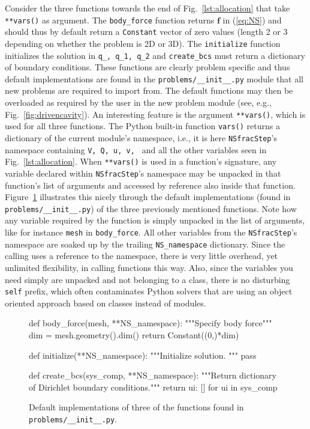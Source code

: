 \documentclass[final,3p,times,twocolumn]{elsarticle}
\newcommand{\inpyth}{\lstinline[style=inlinestyle]} %[]%
\begin{document}
Consider the three functions towards the end of Fig.~\ref{lst:allocation} that take \inpyth{**vars()} as argument. The \inpyth{body_force} function returns $\bm{f}$ in (\ref{eq:NS}) and should thus by default return a \inpyth{Constant} vector of zero values (length 2 or 3 depending on whether the problem is 2D or 3D). The \inpyth{initialize} function initializes the solution in \inpyth{q_, q_1, q_2} and \inpyth{create_bcs} must return a dictionary of boundary conditions. These functions are clearly problem specific and thus default implementations are found in the \inpyth{problems/__init__.py} module that all new problems are required to import from. The default functions may then be overloaded as required by the user in the new problem module (see, e.g., Fig.~\ref{fig:drivencavity}). An interesting feature is the argument \inpyth{**vars()}, which is used for all three functions. The Python built-in function \inpyth{vars()} returns a dictionary of the current module's namespace, i.e., it is here \inpyth{NSfracStep}'s namespace containing \inpyth{V, Q, u, v, } and all the other variables seen in Fig.~\ref{lst:allocation}. When \inpyth{**vars()} is used in a function's signature, any variable declared within \inpyth{NSfracStep}'s namespace may be unpacked in that function's list of arguments and accessed by reference also inside that function. Figure~\ref{lst:defaulthooks} illustrates this nicely through the default implementations (found in \inpyth{problems/__init__.py}) of the three previously mentioned functions. Note how any variable required by the function is simply unpacked in the list of arguments, like for instance \inpyth{mesh}{} in \inpyth{body_force}. All other variables from the \inpyth{NSfracStep}'s namespace are soaked up by the trailing \inpyth{NS_namespace} dictionary. Since the calling uses a reference to the namespace, there is very little overhead, yet unlimited flexibility, in calling functions this way. Also, since the variables you need simply are unpacked and not belonging to a class, there is no disturbing \inpyth{self} prefix, which often contaminates Python solvers that are using an object oriented approach based on classes instead of modules. 
\begin{figure}
\begin{python}
def body_force(mesh, **NS_namespace):
  """Specify body force"""
  dim = mesh.geometry().dim()
  return Constant((0,)*dim)
    
def initialize(**NS_namespace):
  """Initialize solution. """
  pass

def create_bcs(sys_comp, **NS_namespace):
  """Return dictionary of Dirichlet 
  boundary conditions."""
  return {ui: [] for ui in sys_comp}
\end{python}
\caption{Default implementations of three of the functions found in \inpyth{problems/__init__.py}{}. }
\label{lst:defaulthooks}
\end{figure}
\end{document}
